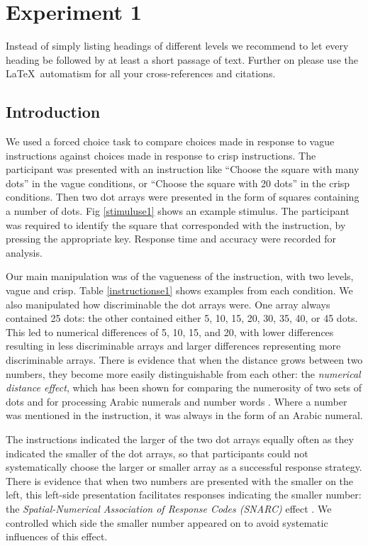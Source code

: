 \section{Experiment 1}
\label{sec:2}
Instead of simply listing headings of different levels we recommend to let every heading be followed by at least a short passage of text. Further on please use the \LaTeX\ automatism for all your cross-references and citations.

\subsection{Introduction}%
We used a forced choice task to compare choices made in response to vague instructions against choices made in response to crisp instructions. The participant was presented with an instruction like ``Choose the square with many dots'' in the vague conditions, or ``Choose the square with 20 dots'' in the crisp conditions. Then two dot arrays were presented in the form of squares containing a number of dots. Fig \ref{stimuluse1} shows an example stimulus. The participant was required to identify the square that corresponded with the instruction, by pressing the appropriate key.
Response time and accuracy were recorded for analysis. 

Our main manipulation was of the vagueness of the instruction, with two levels, vague and crisp. Table \ref{instructionse1} shows examples from each condition.  We also manipulated how discriminable the dot arrays were. One array always contained 25 dots: the other contained either 5, 10, 15, 20, 30, 35, 40, or 45 dots. This led to numerical differences of 5, 10, 15, and 20, with lower differences resulting in less discriminable arrays and larger differences representing more discriminable arrays. There is evidence that when the distance grows between two numbers, they become more easily distinguishable from each other: the \emph{numerical distance effect}, which has been shown for comparing the numerosity of two sets of dots \cite{van123} and for processing Arabic numerals and number words \cite{Dehaene199647}. Where a number was mentioned in the instruction, it was always in the form of an Arabic numeral.

The instructions indicated the larger of the two dot arrays equally often as they indicated the smaller of the dot arrays, so that participants could not systematically choose the larger or smaller array as a successful response strategy. There is evidence that when two numbers are presented with the smaller on the left, this left-side presentation facilitates responses indicating the smaller number: the \emph{Spatial-Numerical Association of Response Codes (SNARC)} effect \cite{dehaene1993mental, gevers2006automatic}. We controlled which side the smaller number appeared on to avoid systematic influences of this effect. 

